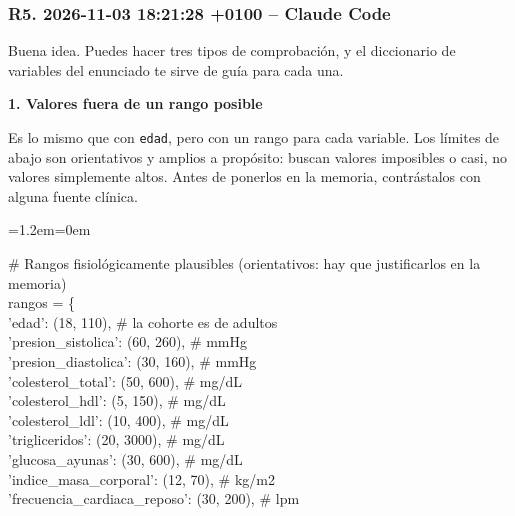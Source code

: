 \documentclass[11pt,a4paper]{article}
\newenvironment{codigo}
  {\par\smallskip\begin{list}{}{\leftmargin=1.2em\rightmargin=0em}\item\relax\ttfamily\scriptsize\raggedright}
  {\end{list}\smallskip}
\begin{document}
\subsubsection*{R5. 2026-11-03 18:21:28 +0100 -- Claude Code}
{\small
Buena idea. Puedes hacer tres tipos de comprobación, y el diccionario de variables del enunciado te sirve de guía para cada una.

\textbf{1. Valores fuera de un rango posible}

Es lo mismo que con \texttt{edad}, pero con un rango para cada variable. Los límites de abajo son orientativos y amplios a propósito: buscan valores imposibles o casi, no valores simplemente altos. Antes de ponerlos en la memoria, contrástalos con alguna fuente clínica.

\begin{codigo}
\# Rangos fisiológicamente plausibles (orientativos: hay que justificarlos en la memoria) \\{}
rangos = \{ \\{}
\hspace*{2.08em}'edad': (18, 110),                     \# la cohorte es de adultos \\{}
\hspace*{2.08em}'presion\_\allowbreak{}sistolica': (60, 260),        \# mmHg \\{}
\hspace*{2.08em}'presion\_\allowbreak{}diastolica': (30, 160),       \# mmHg \\{}
\hspace*{2.08em}'colesterol\_\allowbreak{}total': (50, 600),         \# mg/\allowbreak{}dL \\{}
\hspace*{2.08em}'colesterol\_\allowbreak{}hdl': (5, 150),            \# mg/\allowbreak{}dL \\{}
\hspace*{2.08em}'colesterol\_\allowbreak{}ldl': (10, 400),           \# mg/\allowbreak{}dL \\{}
\hspace*{2.08em}'trigliceridos': (20, 3000),           \# mg/\allowbreak{}dL \\{}
\hspace*{2.08em}'glucosa\_\allowbreak{}ayunas': (30, 600),           \# mg/\allowbreak{}dL \\{}
\hspace*{2.08em}'indice\_\allowbreak{}masa\_\allowbreak{}corporal': (12, 70),      \# kg/\allowbreak{}m2 \\{}
\hspace*{2.08em}'frecuencia\_\allowbreak{}cardiaca\_\allowbreak{}reposo': (30, 200),  \# lpm \\{}

\end{codigo}}
\end{document}
